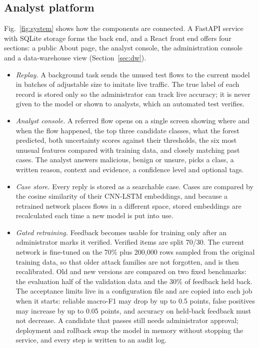 \documentclass[conference]{IEEEtran}
\begin{document}
\subsection{Analyst platform}
Fig.~\ref{fig:system} shows how the components are connected. A FastAPI service with SQLite storage
forms the back end, and a React front end offers four sections: a public About page, the analyst
console, the administration console and a data-warehouse view (Section~\ref{sec:dw}).
\begin{itemize}
\item \textit{Replay.} A background task sends the unused test flows to the current model in batches
of adjustable size to imitate live traffic. The true label of each record is stored only so the
administrator can track live accuracy; it is never given to the model or shown to analysts, which
an automated test verifies.
\item \textit{Analyst console.} A referred flow opens on a single screen showing where and when
the flow happened, the top three candidate classes, what the forest predicted, both uncertainty scores against
their thresholds, the six most unusual features compared with training data, and
closely matching past cases. The analyst answers malicious, benign or unsure, picks a class, a
written reason, context and evidence, a confidence level and optional tags.
\item \textit{Case store.} Every reply is stored as a searchable case. Cases are compared by the
cosine similarity of their CNN-LSTM embeddings, and because a retrained network places flows in a
different space, stored embeddings are recalculated each time a new model is put into use.
\item \textit{Gated retraining.} Feedback becomes usable for training only after an administrator
marks it verified. Verified items are split 70/30. The current network is fine-tuned on the 70\%
plus 200,000 rows sampled from the original training data, so that older attack families are not
forgotten, and is then recalibrated. Old and new versions are compared on two fixed benchmarks: the
evaluation half of the validation data and the 30\% of feedback held back. The acceptance limits
live in a configuration file and are copied into each job when it starts: reliable macro-F1 may
drop by up to 0.5 points, false positives may increase by up to 0.05 points, and accuracy
on held-back feedback must not decrease. A candidate that passes still needs administrator
approval; deployment and rollback swap the model in memory without stopping the service, and every
step is written to an audit log.
\end{itemize}
\end{document}
